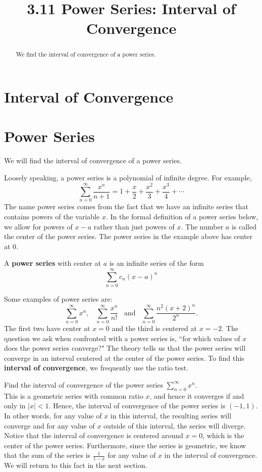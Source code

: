 \documentclass[handout]{ximera}
\title{3.11 Power Series: Interval of Convergence}
\begin{document}
\begin{abstract}
We find the interval of convergence of a power series.
\end{abstract}

\maketitle

\section{Interval of Convergence}

\section{Power Series}

We will find the interval of convergence of a power series.


Loosely speaking, a power series is a polynomial of infinite degree. For example,
\[
\sum_{n=0}^\infty \frac{x^n}{n+1} = 1 + \frac{x}{2} + \frac{x^2}{3} + \frac{x^3}{4} + \cdots
\]
The name power series comes from the fact that we have an infinite series that contains 
powers of the variable $x$. In the formal definition of a power series below, 
we allow for powers of $x-a$ rather than just powers of $x$.  
The number $a$ is called the center of the power series. 
The power series in the example above has center at $0$.
\begin{definition}
A \textbf{power series} with center at $a$ is an infinite series of the form
\[
\sum_{n=0}^\infty c_n(x-a)^n
\]
\end{definition}

Some examples of power series are:
\[ 
\sum_{n=0}^\infty x^n, \;\;\; \sum_{n=0}^\infty \frac{x^n}{n!} 
\;\;\;\text{and}\;\;\; \sum_{n=0}^\infty \frac{n^2(x+ 2)^n}{2^n}.
\]
The first two have center at $x = 0$ and the third is centered at $x = -2$. 
The question we ask when confronted with a power series is, 
``for which values of $x$ does the power series converge?"
The theory tells us that the power series will converge in an interval centered at the 
center of the power series.
To find this \textbf{interval of convergence}, we frequently use the ratio test.

\begin{example}[example 1]
Find the interval of convergence of the power series $\displaystyle{\sum_{n=0}^\infty x^n}$.\\
This is a geometric series with common ratio $x$, and hence it converges if
and only in $|x| < 1$.  Hence, the interval of convergence of the power series is $(-1, 1)$.
In other words, for any value of $x$ in this interval, 
the resulting series will converge and for any value of $x$ outside of this interval, 
the series will diverge. Notice that the interval of convergence is centered 
around $x = 0$, which is the center of the power series. 
Furthermore, since the series is geometric, we know that the sum of the 
series is $\frac{1}{1-x}$ for any value of $x$ in the interval of convergence. 
We will return to this fact in the next section.
\end{example}
\end{document}
